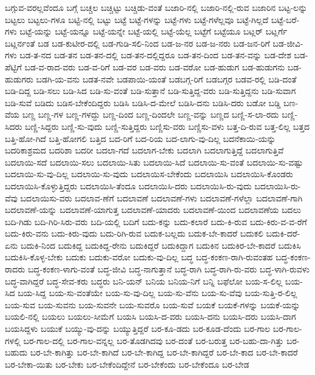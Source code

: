{ಬಗ್ಗುವ-ವರಲ್ಲವೆಂದೂ
ಬಗ್ಗೆ
ಬಚ್ಚಲ
ಬಚ್ಚಿಟ್ಟು
ಬಚ್ಚಿಡು-ವಂತೆ
ಬಜಾರಿ-ನಲ್ಲಿ
ಬಜಾರಿ-ನಲ್ಲಿ-ರುವ
ಬಜಾರಿನ
ಬಟ್ಟ-ಲನ್ನು
ಬಟ್ಟಲು
ಬಟ್ಟಲು-ಗಳೂ
ಬಟ್ಟಿ-ನಲ್ಲಿ
ಬಟ್ಟು
ಬಟ್ಟೆ
ಬಟ್ಟೆ-ಗಳನ್ನು
ಬಟ್ಟೆ-ಗಳು
ಬಟ್ಟೆ-ಗಳೆಲ್ಲವೂ
ಬಟ್ಟೆ-ಗಿಲ್ಲದೆ
ಬಟ್ಟೆ-ಬರೆ-ಗಳು
ಬಟ್ಟೆ-ಯನ್ನು
ಬಟ್ಟೆ-ಯನ್ನೂ
ಬಟ್ಟೆ-ಯನ್ನೇ
ಬಟ್ಟೆ-ಯಲ್ಲಿ
ಬಟ್ಟೆ-ಯೆಲ್ಲ
ಬಟ್ಟೆಗೆ
ಬಟ್ಟೆಯೂ
ಬಟ್ಲರ್
ಬಟ್ಲರ್ಗೆ
ಬಟ್ಲರ್ನಂತೆ
ಬಡ
ಬಡ-ಕುಟೀರ-ದಲ್ಲಿ
ಬಡ-ಗುಡಿ-ಸಲಿ-ನಿಂದ
ಬಡ-ಜ-ನರ
ಬಡ-ಜ-ನರು
ಬಡ-ಜನ-ರಿಗೆ
ಬಡ-ಜೀವಿ-ಗಳು
ಬಡ-ತ-ನದ
ಬಡ-ತನ
ಬಡ-ತನ-ದಲ್ಲಿ
ಬಡ-ತನ-ದಲ್ಲಿದ್ದರೂ
ಬಡ-ತನ-ದಿಂದ
ಬಡ-ತನ-ವನ್ನು
ಬಡ-ದೇಶ
ಬಡ-ಪೆಟ್ಟಿಗೆ
ಬಡ-ವ-ರಾದ-ವರು
ಬಡ-ವ-ರಿಗೆ
ಬಡ-ವರ
ಬಡ-ವರು
ಬಡ-ವರೋ
ಬಡ-ಹುಡುಗ
ಬಡ-ಹುಡುಗನು
ಬಡ-ಹುಡುಗರು
ಬಡಗಿ-ಯ-ವನು
ಬಡತ-ನವೇ
ಬಡಪಾಯಿ-ಯಂತೆ
ಬಡಬಗ್ಗ-ರಿಗೆ
ಬಡಬಗ್ಗರ
ಬಡವ-ರಲ್ಲಿ
ಬಡಿ-ದಂತೆ
ಬಡಿ-ದಿದ್ದ
ಬಡಿ-ಸಲು
ಬಡಿ-ಸಿದ
ಬಡಿ-ಸು-ವಂತೆ
ಬಡಿ-ಸುತ್ತಾನೆ
ಬಡಿ-ಸುತ್ತಿದ್ದ-ವರು
ಬಡಿ-ಸುತ್ತಿದ್ದನು
ಬಡಿ-ಸುವಾಗ
ಬಡಿ-ಸುವೆ
ಬಡಿದು
ಬಡಿಸ-ಬೇಕೆಂದಿದ್ದರು
ಬಡಿಸಿ
ಬಡಿಸಿ-ದ-ಮೇಲೆ
ಬಡಿಸಿ-ದನು
ಬಡಿಸಿ-ದರು
ಬಡೋ
ಬಡ್ಡಿ
ಬಣ-ವೆಯ
ಬಣ್ಣ
ಬಣ್ಣ-ಗಳ
ಬಣ್ಣ-ಗಳದ್ದು
ಬಣ್ಣ-ದಿಂದ
ಬಣ್ಣ-ದಿಂದಲೇ
ಬಣ್ಣ-ವನ್ನು
ಬಣ್ಣದ
ಬಣ್ಣಿ-ಸ-ಲಾ-ರದು
ಬಣ್ಣಿ-ಸಿದರು
ಬಣ್ಣಿ-ಸಿದ್ದರು
ಬಣ್ಣಿ-ಸು-ವುದು
ಬಣ್ಣಿ-ಸುತ್ತಿದ್ದರು
ಬಣ್ಣಿಸು-ವರು
ಬಣ್ಣಿಸು-ವಳು
ಬತ್ತ-ದಿ-ರುವ
ಬತ್ತ-ಲಿಲ್ಲ
ಬತ್ತದ
ಬತ್ತಿ-ಹೋ-ಗಿದೆ
ಬತ್ತಿ-ಹೋಗಲಿ
ಬತ್ತಿದ
ಬದ-ರಿಗೆ
ಬದ-ರಿಯ
ಬದ-ಲಾಗು-ವು-ದಿಲ್ಲ
ಬದನೆಕಾಯಿ-ಯನ್ನು
ಬದರಿಕಾಶ್ರಮದ
ಬದರಿಶಾ
ಬದರೀ
ಬದಲಾ-ಗದೆ
ಬದಲಾಗ-ಬೇಕು
ಬದಲಾಗಿ
ಬದಲಾಗುತ್ತಿದ್ದೆ
ಬದಲಾಗುತ್ತಿವೆ
ಬದಲಾಯಿ-ಸದೆ
ಬದಲಾಯಿ-ಸಲು
ಬದಲಾಯಿ-ಸಿತು
ಬದಲಾಯಿ-ಸಿದೆ
ಬದಲಾಯಿ-ಸು-ವಂತೆ
ಬದಲಾಯಿ-ಸು-ವಷ್ಟು
ಬದಲಾಯಿ-ಸು-ವು-ದಿಲ್ಲ
ಬದಲಾಯಿ-ಸು-ವುದು
ಬದಲಾಯಿಸ-ಬೇಕೆಂದು
ಬದಲಾಯಿಸಿ
ಬದಲಾಯಿಸಿ-ಕೊಂಡರು
ಬದಲಾಯಿಸಿ-ಕೊಳ್ಳುತ್ತಿದ್ದರು
ಬದಲಾಯಿಸಿ-ತೆಂದೂ
ಬದಲಾಯಿಸಿ-ದರು
ಬದಲಾಯಿಸಿ-ರು-ವುದು
ಬದಲಾಯಿಸಿ-ರು-ವೆವು
ಬದಲಾಯಿಸು-ವರು
ಬದಲಾವ-ಣೆಗೆ
ಬದಲಾವಣೆ
ಬದಲಾವಣೆ-ಗಳು
ಬದಲಾವಣೆ-ಗಳೆಲ್ಲಾ
ಬದಲಾವಣೆ-ಗಾಗಿ
ಬದಲಾವಣೆ-ಯನ್ನು
ಬದಲಾವಣೆ-ಯಾಗುತ್ತ
ಬದಲಾವಣೆ-ಯಾದರು
ಬದಲಾವಣೆ-ಯಿಂದ
ಬದಲಾವಣೆಯ
ಬದಲು
ಬದಿ-ಗಿಡು
ಬದಿ-ಗಿರಿ-ಸಿರು-ವರು
ಬದಿ-ಯಲ್ಲಿ
ಬದಿಗೆ
ಬದು-ಕನ್ನು
ಬದು-ಕಲಾರೆ
ಬದು-ಕಿ-ರುವ
ಬದು-ಕಿರು-ವ-ವ-ರೆಗೆ
ಬದು-ಕಿರು-ವನು
ಬದು-ಕಿರು-ವುದು
ಬದು-ರಿಗಿ-ರುವ
ಬದುಕ-ಬಲ್ಲದು
ಬದುಕ-ಬೇ-ಕಾದರೆ
ಬದುಕಲಿ
ಬದುಕಿ-ದರೆ-ಏನು
ಬದುಕಿ-ನಿಂದ
ಬದುಕಿದ್ದ
ಬದುಕಿದ್ದ-ರೇನು
ಬದುಕಿದ್ದರೆ
ಬದುಕಿದ್ದಾಗ
ಬದುಕಿನ
ಬದುಕಿರ-ಬೇ-ಕಾದರೆ
ಬದುಕಿಸಿ
ಬದುಕಿಸಿ-ಕೊಳ್ಳ-ಬೇಕು
ಬದುಕು
ಬದುಕು-ವರೋ
ಬದುಕು-ವು-ದಿಲ್ಲ
ಬದ್ಧ
ಬದ್ಧ-ಕಂಕಣ-ರಾಗಿ-ರುವಂತಹ
ಬದ್ಧ-ಕಂಕಣ-ರಾದರು
ಬದ್ಧ-ಕಂಕಣ-ಳಾಗು-ವಂತೆ
ಬದ್ಧ-ಜೀವಿ
ಬದ್ಧ-ನಾಗುತ್ತಾನೆ
ಬದ್ಧ-ರಾಗಿ
ಬದ್ಧ-ರಾಗಿ-ರು-ವರು
ಬದ್ಧ-ಳಾಗಿ-ರುವಳು
ಬದ್ಧ-ವಾಗಿದ್ದರೆ
ಬದ್ಧ-ಸೇವ-ಕರು
ಬದ್ಧರು
ಬನಿ-ಯನ್
ಬನಿಯ
ಬನಿಯ-ನಿಗೆ
ಬನ್ನಿ
ಬಫೆಲೋ
ಬಯ-ಸ-ಲಿಲ್ಲ
ಬಯ-ಸಿದ
ಬಯ-ಸಿದ್ದ
ಬಯ-ಸು-ವಂತೆಯೇ
ಬಯ-ಸು-ವು-ದಿಲ್ಲ
ಬಯ-ಸು-ವೆನು
ಬಯ-ಸು-ವೆವು
ಬಯ-ಸುತ್ತಿ-ರ-ಲಿಲ್ಲ
ಬಯ-ಸುವ
ಬಯ-ಸುವನು
ಬಯ-ಸುವನೇ
ಬಯ-ಸುವರೊ
ಬಯ-ಸುವೆ
ಬಯಕೆ
ಬಯಕೆ-ಗಳನ್ನು
ಬಯಕೆ-ಯನ್ನು
ಬಯಲಿ-ನಲ್ಲಿ
ಬಯಲು
ಬಯಲು-ಸೀಮೆಗೆ
ಬಯಸಿ
ಬಯಸಿ-ದ-ವರು
ಬಯಸಿ-ದನು
ಬಯಸಿ-ದರು
ಬಯಸಿ-ದಾಗ
ಬಯಸಿದ್ದಳು
ಬಯುಕೆ
ಬಯ್ಯು-ವು-ದನ್ನು
ಬಯ್ಯುತ್ತಿದ್ದರೆ
ಬರ-ಕೂ-ಡದು
ಬರ-ಕೂಡ-ದೆಂದು
ಬರ-ಗಾಲ
ಬರ-ಗಾಲ-ಗಳಲ್ಲಿ
ಬರ-ಗಾಲ-ದಲ್ಲಿ
ಬರ-ಗಾಲ-ವನ್ನಲ್ಲ
ಬರ-ತೊಡಗಿದವು
ಬರ-ದಂತೆ
ಬರ-ಬರುತ್ತ
ಬರ-ಬಹು-ದಾ-ಗಿತ್ತು
ಬರ-ಬಹುದು
ಬರ-ಬೇ-ಕಾಗಿತ್ತು
ಬರ-ಬೇ-ಕಾಗಿದೆ
ಬರ-ಬೇ-ಕಾಗಿದ್ದ
ಬರ-ಬೇ-ಕಾಗಿದ್ದರೆ
ಬರ-ಬೇ-ಕಾದ
ಬರ-ಬೇ-ಕಾದರೆ
ಬರ-ಬೇಕಾ-ಯಿತು
ಬರ-ಬೇಕು
ಬರ-ಬೇಕೆಂದಿದ್ದೇನೆ
ಬರ-ಬೇಕೆಂದು
ಬರ-ಬೇಕೆಂದೂ
ಬರ-ಬೇಡ
}

